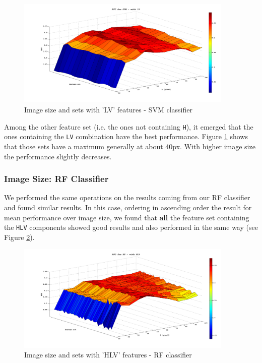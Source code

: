 \begin{figure}[!hbf]
 \begin{center}
  \includegraphics[width=0.92\textwidth]{./images/exp07/SVM_AUC_LV.png}
  \caption{Image size and sets with 'LV' features - SVM classifier}
  \label{ch6:fig18}
 \end{center}
\end{figure}

Among the other feature set (i.e. the ones not containing \texttt{H}), it emerged that the ones containing the \texttt{LV} combination have the best performance.
Figure \ref{ch6:fig18} shows that those sets have a maximum generally at about 40px. With higher image size the performance slightly decreases.


\vspace{0.5cm}


\subsubsection{Image Size: RF Classifier}

We performed the same operations on the results coming from our \Gls{RF} classifier and found similar results. In this case, ordering in ascending order 
the result for mean performance over image size, we found that \textbf{all} the feature set containing the \texttt{HLV} components showed good results and
also performed in the same way (see Figure \ref{ch6:fig19}).

\begin{figure}[!hbf]
 \begin{center}
  \includegraphics[width=0.92\textwidth]{./images/exp07/RF_AUC_HLV.png}
  \caption{Image size and sets with 'HLV' features - RF classifier}
  \label{ch6:fig19}
 \end{center}
\end{figure}

